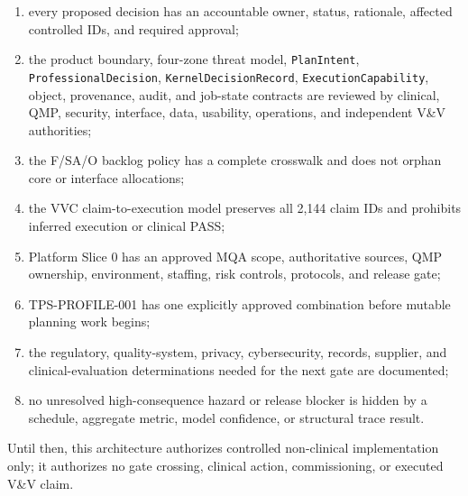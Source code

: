 \documentclass[11pt,letterpaper]{article}
\begin{document}
\begin{enumerate}
\item every proposed decision has an accountable owner, status, rationale, affected controlled IDs, and required approval;
\item the product boundary, four-zone threat model, \texttt{PlanIntent}, \texttt{ProfessionalDecision}, \texttt{KernelDecisionRecord}, \texttt{ExecutionCapability}, object, provenance, audit, and job-state contracts are reviewed by clinical, QMP, security, interface, data, usability, operations, and independent V\&V authorities;
\item the F/SA/O backlog policy has a complete crosswalk and does not orphan core or interface allocations;
\item the VVC claim-to-execution model preserves all 2,144 claim IDs and prohibits inferred execution or clinical PASS;
\item Platform Slice 0 has an approved MQA scope, authoritative sources, QMP ownership, environment, staffing, risk controls, protocols, and release gate;
\item TPS-PROFILE-001 has one explicitly approved combination before mutable planning work begins;
\item the regulatory, quality-system, privacy, cybersecurity, records, supplier, and clinical-evaluation determinations needed for the next gate are documented;
\item no unresolved high-consequence hazard or release blocker is hidden by a schedule, aggregate metric, model confidence, or structural trace result.
\end{enumerate}

\enlargethispage{\baselineskip}
Until then, this architecture authorizes controlled non-clinical implementation only; it authorizes no gate crossing, clinical action, commissioning, or executed V\&V claim.
\end{document}
